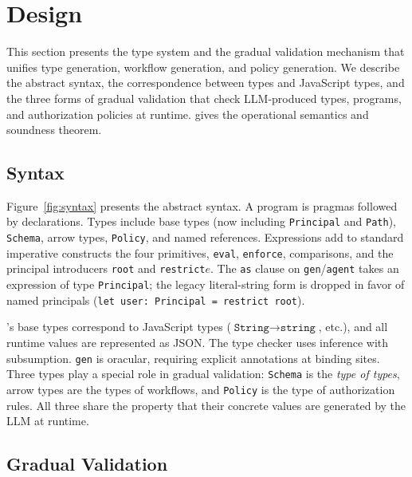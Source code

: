 \section{Design}
\label{sec:design}

This section presents the \pact type system and the gradual validation mechanism
that unifies type generation, workflow generation, and policy generation. We
describe the abstract syntax, the correspondence between \pact types and
JavaScript types, and the three forms of gradual validation that check
LLM-produced types, programs, and authorization policies at runtime.
 gives the operational semantics and soundness theorem.

\subsection{Syntax}
\label{sec:design-syntax}

\begin{sloppypar}
Figure~\ref{fig:syntax} presents the abstract syntax. A program is pragmas
followed by declarations. Types include base types (now including
\texttt{Principal} and \texttt{Path}), \texttt{Schema}, arrow types,
\texttt{Policy}, and named references. Expressions add to standard imperative
constructs the four primitives, \texttt{eval}, \texttt{enforce}, comparisons,
and the principal introducers \texttt{root} and \texttt{restrict}\;$e$. The
\texttt{as} clause on \texttt{gen}/\allowbreak\texttt{agent} takes an expression
of type \texttt{Principal}; the legacy literal-string form is dropped in favor
of named principals (\texttt{let user: Principal = restrict root}).
\end{sloppypar}



\begin{sloppypar}
\pact's base types correspond to JavaScript types
($\texttt{String}{\to}\texttt{string}$, etc.), and all runtime values are
represented as JSON. The type checker uses inference with subsumption.
\texttt{gen} is oracular, requiring explicit annotations at binding sites. Three
types play a special role in gradual validation: \texttt{Schema} is the
\emph{type of types}, arrow types are the types of workflows, and
\texttt{Policy} is the type of authorization rules. All three share the property
that their concrete values are generated by the LLM at runtime.
\end{sloppypar}

\subsection{Gradual Validation}
\label{sec:design-gradual}

